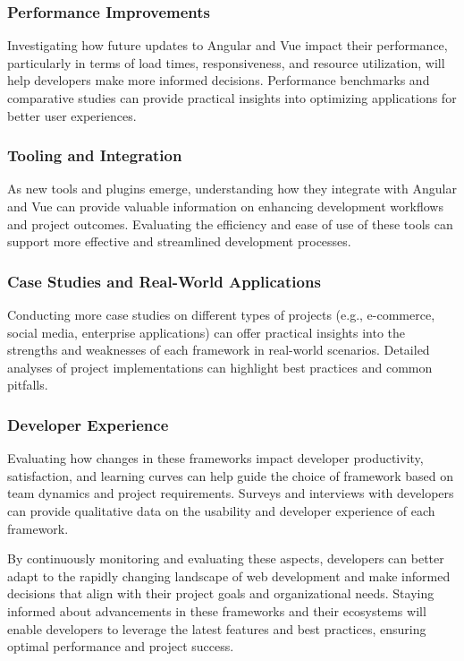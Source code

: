 \documentclass[conference]{IEEEtran}
\begin{document}
\subsubsection{Performance Improvements} Investigating how future updates to Angular and Vue impact their performance, particularly in terms of load times, responsiveness, and resource utilization, will help developers make more informed decisions. Performance benchmarks and comparative studies can provide practical insights into optimizing applications for better user experiences.
\newline\subsubsection{Tooling and Integration} As new tools and plugins emerge, understanding how they integrate with Angular and Vue can provide valuable information on enhancing development workflows and project outcomes. Evaluating the efficiency and ease of use of these tools can support more effective and streamlined development processes.
\newline\subsubsection{Case Studies and Real-World Applications} Conducting more case studies on different types of projects (e.g., e-commerce, social media, enterprise applications) can offer practical insights into the strengths and weaknesses of each framework in real-world scenarios. Detailed analyses of project implementations can highlight best practices and common pitfalls.
\newline\subsubsection{Developer Experience} Evaluating how changes in these frameworks impact developer productivity, satisfaction, and learning curves can help guide the choice of framework based on team dynamics and project requirements. Surveys and interviews with developers can provide qualitative data on the usability and developer experience of each framework.

By continuously monitoring and evaluating these aspects, developers can better adapt to the rapidly changing landscape of web development and make informed decisions that align with their project goals and organizational needs. Staying informed about advancements in these frameworks and their ecosystems will enable developers to leverage the latest features and best practices, ensuring optimal performance and project success.
\end{document}
